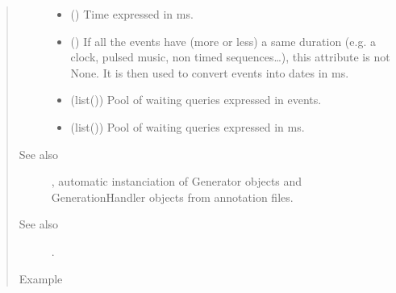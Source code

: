 \documentclass[letterpaper,10pt,english]{sphinxmanual}
\begin{document}
\begin{fulllineitems}
\begin{quote}
\begin{description}
\begin{itemize}
\item {} 
\sphinxstyleliteralstrong{{[}}\sphinxstyleliteralstrong{{]}} () \textendash{} Time expressed in ms.

\item {} 
 () \textendash{} If all the events have (more or less) a same duration (e.g. a clock, pulsed music, non timed sequences…), this attribute is not None. It is then used to convert events into dates in ms.

\item {} 
 (list({\hyperref[\detokenize{index:Query.Query}]{}})) \textendash{} Pool of waiting queries expressed in events.

\item {} 
 (list({\hyperref[\detokenize{index:Query.Query}]{}})) \textendash{} Pool of waiting queries expressed in ms.

\end{itemize}

\item[{See also}] \leavevmode
{\hyperref[\detokenize{index:module-GeneratorBuilder}]{}}, automatic instanciation of Generator objects and GenerationHandler objects from annotation files.

\item[{See also}] \leavevmode
{} .

\item[{Example}] \leavevmode
\end{description}\end{quote}


\end{fulllineitems}
\end{document}
